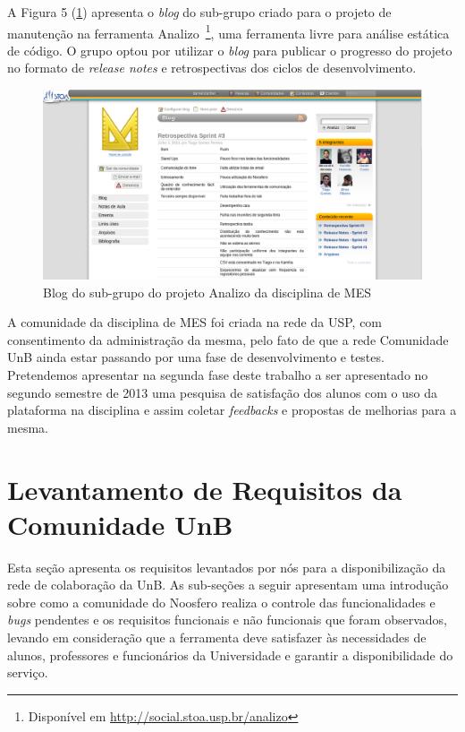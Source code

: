 A Figura 5 (\ref{analizo}) apresenta o \textit{blog} do sub-grupo
criado para o projeto de manutenção na ferramenta Analizo~\footnote{Disponível
em \url{http://social.stoa.usp.br/analizo}}, uma ferramenta livre
para análise estática de código. O grupo optou por utilizar o \textit{blog}
para publicar o progresso do projeto no formato de \textit{release notes} e
retrospectivas dos ciclos de desenvolvimento.

\begin{figure}[h]
	\centering
	\label{analizo}
		\includegraphics[keepaspectratio=true,scale=0.3]
		{figuras/analizo.eps}
	\caption{Blog do sub-grupo do projeto Analizo da disciplina de MES }
\end{figure}

A comunidade da disciplina de MES foi criada na rede da USP, com consentimento
da administração da mesma, pelo fato de que a rede Comunidade UnB ainda estar
passando por uma fase de desenvolvimento e testes. Pretendemos apresentar
na segunda fase deste trabalho a ser apresentado no segundo semestre de 2013
uma pesquisa de satisfação dos alunos com o uso da plataforma na disciplina e
assim coletar \textit{feedbacks} e propostas de melhorias para a mesma. 


\section{Levantamento de Requisitos da Comunidade UnB}
\label{requisitos}

Esta seção apresenta os requisitos levantados por nós para a disponibilização
da rede de colaboração da UnB.
%
As sub-seções a seguir apresentam uma introdução sobre como a comunidade
do Noosfero realiza o controle das funcionalidades e \textit{bugs} pendentes e
os requisitos funcionais e não funcionais que foram observados, levando
em consideração que a ferramenta deve satisfazer às necessidades de alunos,
professores e funcionários da Universidade e garantir a disponibilidade do
serviço.

